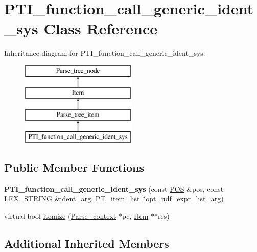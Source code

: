 \hypertarget{classPTI__function__call__generic__ident__sys}{}\section{P\+T\+I\+\_\+function\+\_\+call\+\_\+generic\+\_\+ident\+\_\+sys Class Reference}
\label{classPTI__function__call__generic__ident__sys}
Inheritance diagram for P\+T\+I\+\_\+function\+\_\+call\+\_\+generic\+\_\+ident\+\_\+sys\+:\begin{figure}[H]
\begin{center}
\leavevmode
\includegraphics[height=4.000000cm]{classPTI__function__call__generic__ident__sys}
\end{center}
\end{figure}
\subsection*{Public Member Functions}
\begin{DoxyCompactItemize}
\item 
\mbox{\label{classPTI__function__call__generic__ident__sys_a5e493cef9492ea54ed019c2cc26761d1}} 
{\bfseries P\+T\+I\+\_\+function\+\_\+call\+\_\+generic\+\_\+ident\+\_\+sys} (const \mbox{\hyperlink{structYYLTYPE}{P\+OS}} \&pos, const L\+E\+X\+\_\+\+S\+T\+R\+I\+NG \&ident\+\_\+arg, \mbox{\hyperlink{classPT__item__list}{P\+T\+\_\+item\+\_\+list}} $\ast$opt\+\_\+udf\+\_\+expr\+\_\+list\+\_\+arg)
\item 
virtual bool \mbox{\hyperlink{classPTI__function__call__generic__ident__sys_a7fc59d17019e0b99f768ebbf10edf067}{itemize}} (\mbox{\hyperlink{structParse__context}{Parse\+\_\+context}} $\ast$pc, \mbox{\hyperlink{classItem}{Item}} $\ast$$\ast$res)
\end{DoxyCompactItemize}
\subsection*{Additional Inherited Members}


